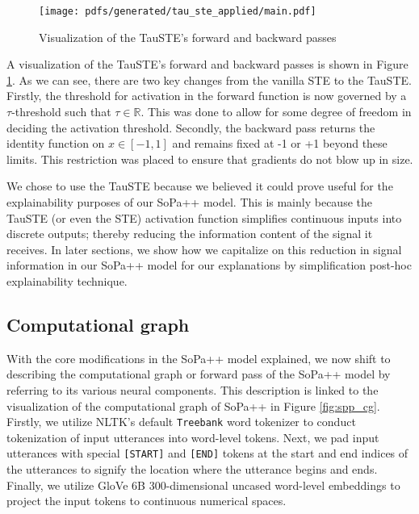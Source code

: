 \begin{figure}[t!]
  \centering
  \texttt{[image: pdfs/generated/tau\_ste\_applied/main.pdf]}
  \caption{Visualization of the TauSTE's forward and backward passes}
  \label{fig:tau_ste}
\end{figure}

A visualization of the TauSTE's forward and backward passes is shown in Figure
\ref{fig:tau_ste}. As we can see, there are two key changes from the vanilla STE
to the TauSTE. Firstly, the threshold for activation in the forward function is
now governed by a $\tau$-threshold such that $\tau \in \mathbb{R}$. This was
done to allow for some degree of freedom in deciding the activation threshold.
Secondly, the backward pass returns the identity function on $x \in [-1,1]$ and
remains fixed at -1 or +1 beyond these limits. This restriction was placed to
ensure that gradients do not blow up in size.

We chose to use the TauSTE because we believed it could prove useful for the
explainability purposes of our SoPa++ model. This is mainly because the TauSTE
(or even the STE) activation function simplifies continuous inputs into discrete
outputs; thereby reducing the information content of the signal it receives. In
later sections, we show how we capitalize on this reduction in signal
information in our SoPa++ model for our explanations by simplification post-hoc
explainability technique.

\subsection{Computational graph}

With the core modifications in the SoPa++ model explained, we now shift to
describing the computational graph or forward pass of the SoPa++ model by
referring to its various neural components. This description is linked to the
visualization of the computational graph of SoPa++ in Figure \ref{fig:spp_cg}.
Firstly, we utilize NLTK's default \texttt{Treebank} word tokenizer
\citep{bird-loper-2004-nltk} to conduct tokenization of input utterances into
word-level tokens. Next, we pad input utterances with special \texttt{[START]}
and \texttt{[END]} tokens at the start and end indices of the utterances to
signify the location where the utterance begins and ends. Finally, we utilize
GloVe 6B 300-dimensional uncased word-level embeddings
\citep{pennington2014glove} to project the input tokens to continuous numerical
spaces. 

